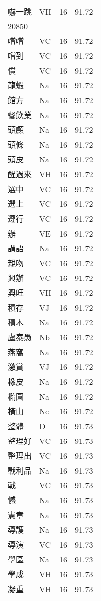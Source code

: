\documentclass[twocolumn]{book}
\begin{document}
\begin{supertabular}{llrr}
嚇一跳 & VH & 16 &  91.72\\
20850\\
嚐嚐 & VC & 16 &  91.72\\
嚐到 & VC & 16 &  91.72\\
償 & VC & 16 &  91.72\\
龍蝦 & Na & 16 &  91.72\\
館方 & Na & 16 &  91.72\\
餐飲業 & Na & 16 &  91.72\\
頭顱 & Na & 16 &  91.72\\
頭條 & Na & 16 &  91.72\\
頭皮 & Na & 16 &  91.72\\
醒過來 & VH & 16 &  91.72\\
選中 & VC & 16 &  91.72\\
選上 & VC & 16 &  91.72\\
遵行 & VC & 16 &  91.72\\
辦 & VE & 16 &  91.72\\
謂語 & Na & 16 &  91.72\\
親吻 & VC & 16 &  91.72\\
興辦 & VC & 16 &  91.72\\
興旺 & VH & 16 &  91.72\\
積存 & VJ & 16 &  91.72\\
積木 & Na & 16 &  91.72\\
盧泰愚 & Nb & 16 &  91.72\\
燕窩 & Na & 16 &  91.72\\
激賞 & VJ & 16 &  91.72\\
橡皮 & Na & 16 &  91.72\\
橢圓 & Na & 16 &  91.72\\
橫山 & Nc & 16 &  91.72\\
整體 & D & 16 &  91.73\\
整理好 & VC & 16 &  91.73\\
整理出 & VC & 16 &  91.73\\
戰利品 & Na & 16 &  91.73\\
戰 & VC & 16 &  91.73\\
憾 & Na & 16 &  91.73\\
憲章 & Na & 16 &  91.73\\
導護 & Na & 16 &  91.73\\
導演 & VC & 16 &  91.73\\
學區 & Na & 16 &  91.73\\
學成 & VH & 16 &  91.73\\
凝重 & VH & 16 &  91.73\\

\end{supertabular}
\end{document}
